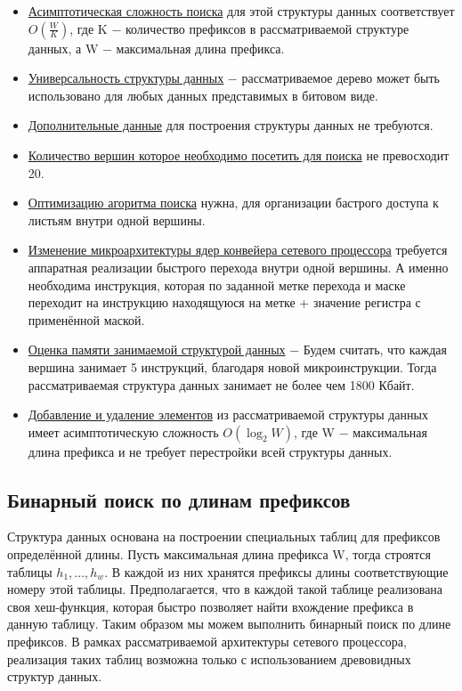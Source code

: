 \documentclass[a4peper, 12pt, titlepage, finall]{report}
\begin{document}
            \begin{itemize}
                \item\underline{Асимптотическая сложность поиска} для этой структуры данных соответствует {\ttfamily $O(\frac{W}{K})$},
                где {\ttfamily K} $-$ количество префиксов в рассматриваемой структуре данных, а {\ttfamily W} $-$ максимальная длина префикса.
                \item\underline{Универсальность структуры данных} $-$ рассматриваемое дерево может быть использовано для любых данных представимых в битовом виде.
                \item\underline{Дополнительные данные} для построения структуры данных не требуются.
                \item\underline{Количество вершин которое необходимо посетить для поиска} не превосходит 20.
                \item\underline{Оптимизацию агоритма поиска} нужна, для организации бастрого доступа к листьям внутри одной вершины.
                \item\underline{Изменение микроархитектуры ядер конвейера сетевого процессора} требуется аппаратная реализации быстрого перехода внутри одной вершины.
                А именно необходима инструкция, которая по заданной метке перехода и маске переходит на инструкцию находящуюся на метке + значение регистра с применённой маской.
                \item\underline{Оценка памяти занимаемой структурой данных} $-$ Будем считать, что каждая вершина занимает 5 инструкций, благодаря новой микроинструкции.
                Тогда рассматриваемая структура данных занимает не более чем 1800 Кбайт.
                \item\underline{Добавление и удаление элементов} из рассматриваемой структуры данных имеет асимптотическую сложность 
                {\ttfamily $O(\log_2{W})$}, где {\ttfamily W} $-$ максимальная длина префикса и не требует перестройки всей структуры данных.\\
            \end{itemize}

        \subsection{Бинарный поиск по длинам префиксов}
            Структура данных основана на построении специальных таблиц для префиксов определённой длины. Пусть максимальная длина префикса {\ttfamily W}, 
            тогда строятся таблицы {\ttfamily $h_{1},\ldots,h_{w}$}. В каждой из них хранятся префиксы длины соответствующие номеру этой таблицы. Предполагается, 
            что в каждой такой таблице реализована своя хеш-функция, которая быстро позволяет найти вхождение префикса в данную таблицу.
            Таким образом мы можем выполнить бинарный поиск по длине префиксов. В рамках рассматриваемой архитектуры сетевого процессора, реализация таких таблиц возможна только
            с использованием древовидных структур данных.
\end{document}
